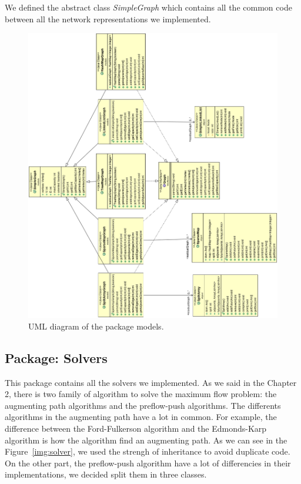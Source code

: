 We defined the abstract class \textit{SimpleGraph} which contains all the common code between all the network representations we implemented. 

\begin{figure}
\centering
\includegraphics[scale=0.45]{images/models_diagram.png}
\caption{UML diagram of the package models.}
\label{img:models}
\end{figure}

\subsection{Package: Solvers}
 This package contains all the solvers we implemented. As we said in the Chapter 2, there is two family of algorithm to solve the maximum flow problem: the augmenting path algorithms and the preflow-push algorithms. The differents algorithms in the augmenting path have a lot in common. For example, the difference between the Ford-Fulkerson algorithm and the Edmonds-Karp algorithm is how the algorithm find an augmenting path.  As we can see in the Figure~\ref{img:solver}, we used the strengh of inheritance to avoid duplicate code. On the other part, the preflow-push algorithm have a lot of differencies in their implementations, we decided split them in three classes.



